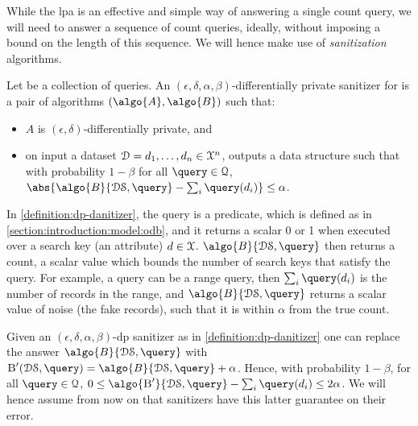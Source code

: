 			While the \acrlong{lpa} is an effective and simple way of answering a single count query, we will need to answer a sequence of count queries, ideally, without imposing a bound on the length of this sequence.
			We will hence make use of \emph{sanitization} algorithms.

			\begin{definition}\label{definition:dp-danitizer}
				Let \querySet{} be a collection of queries.
				An $(\epsilon, \delta, \alpha, \beta)$-differentially private sanitizer for \querySet{} is a pair of algorithms $(\algo{A}, \algo{B})$ such that:
				\begin{itemize}
					\item $A$ is $(\epsilon, \delta)$-differentially private, and
					\item on input a dataset $\mathcal{D} = d_1, \allowbreak \ldots, \allowbreak d_{n} \in \mathcal{X}^{n}$,  outputs a data structure \serverDS{} such that with probability $1 - \beta$ for all $\query \in \querySet$, $\abs{ \algo{B}{ \serverDS, \query } - \sum_i \query(d_i) } \leq \alpha$.
				\end{itemize}
			\end{definition}

			In \cref{definition:dp-danitizer}, the query is a predicate, which is defined as in \cref{section:introduction:model:odb}, and it returns a scalar 0 or 1 when executed over a search key (an attribute) $d \in \mathcal{X}$.
			$\algo{B}{ \serverDS, \query }$ then returns a count, a scalar value which bounds the number of search keys that satisfy the query.
			For example, a query \query{} can be a range query, then $ \sum_i \query(d_i) $ is the number of records in the range, and $ \algo{B}{ \serverDS, \query } $ returns a scalar value of noise (the fake records), such that it is within $\alpha$ from the true count.

			\begin{remark}\label{remark:dp-sanitizer-guarantees}
				Given an $(\epsilon, \delta, \alpha, \beta)$-\acrshort{dp} sanitizer as in \cref{definition:dp-danitizer} one can replace the answer $\algo{B}{ \serverDS, \query }$ with $\textsc{B}^\prime ( \serverDS, \allowbreak \query ) = \algo{B}{ \serverDS, \query } + \alpha$.
				Hence, with probability $1 - \beta$, for all $\query \in \querySet$, $0 \leq \algo{\ensuremath{\textsc{B}^\prime}}{ \serverDS, \query } - \sum_i \query(d_i) \leq 2 \alpha$.
				We will hence assume from now on that sanitizers have this latter guarantee on their error.
			\end{remark}


